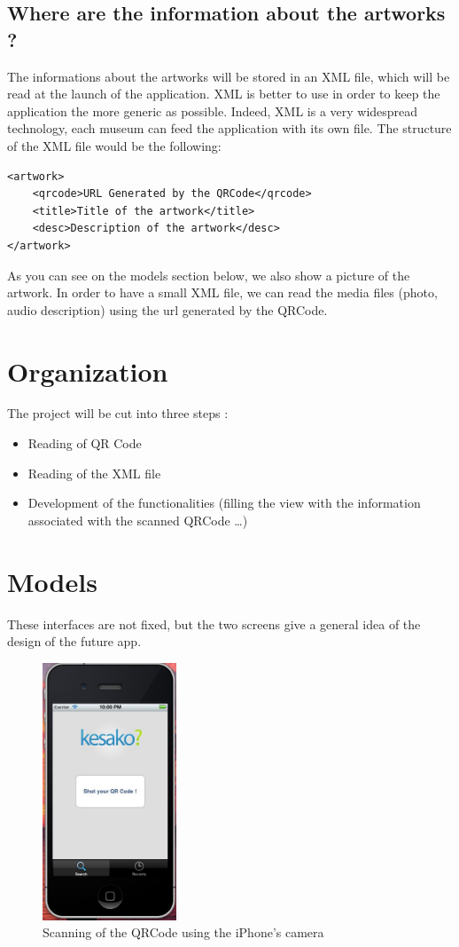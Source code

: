 \documentclass[a4paper, 12pt, final]{article}
\begin{document}
 \subsection{Where are the information about the artworks ?}
The informations about the artworks will be stored in an XML file, which will be read at the launch of the application. XML is better to use in order to keep the application the more generic as possible. Indeed, XML is a very widespread technology, each museum can feed the application with its own file. The structure of the XML file would be the following: 
\begin{lstlisting}
<artwork>
	<qrcode>URL Generated by the QRCode</qrcode>
	<title>Title of the artwork</title>
	<desc>Description of the artwork</desc>
</artwork> 
\end{lstlisting} 
As you can see on the models section below, we also show a picture of the artwork. In order to have a small XML file, we can read the media files (photo, audio description) using the url generated by the QRCode. 

\section{Organization}
The project will be cut into three steps :
\begin{itemize}
\item Reading of QR Code
\item Reading of the XML file
\item Development of the functionalities (filling the view with the information associated with the scanned QRCode …)
\end{itemize}

\section{Models} 
These interfaces are not fixed, but the two screens give a general idea of the design of the future app.\\ 
\begin{figure}[!h] %
\centering
\includegraphics[width=4cm]{1.jpg} %
\caption{Scanning of the QRCode using the iPhone's camera} %
\label{api} %
\end{figure} %
 
\end{document}
